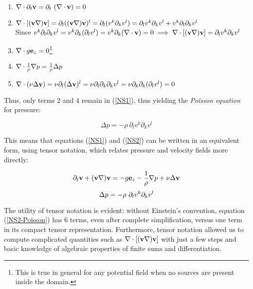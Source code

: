 \begin{enumerate}
 \item $\nabla\cdot \partial_t\mathbf{v} = \partial_t \ (\nabla\cdot \mathbf{v}) = 0$
 \item $\nabla\cdot [(\mathbf{v}\nabla)\mathbf{v}] = \partial_l((\mathbf{v}\nabla)\mathbf{v})^l = \partial_l(v^k\partial_kv^l) = \partial_lv^k\partial_kv^l + v^k\partial_l\partial_kv^l$ \\Since $v^k\partial_l\partial_kv^l = v^k\partial_k(\partial_lv^l) = v^k\partial_k (\nabla\cdot \mathbf{v}) = 0 \implies \nabla\cdot [(\mathbf{v}\nabla)\mathbf{v}] = \partial_lv^k\partial_kv^l$
 \item $\nabla\cdot g\mathbf{e}_z = 0$\footnote{This is true in general for any potential field when no sources are present inside the domain.}
 \item $\nabla\cdot\frac{1}{\rho}\nabla p = \frac{1}{\rho}\Delta p$
 \item $\nabla\cdot (\nu\Delta\mathbf{v}) = \nu\partial_l(\Delta\mathbf{v})^l = \nu\partial_l\partial_k\partial_kv^l = \nu\partial_k\partial_k(\partial_lv^l) = 0$
\end{enumerate}

Thus, only terms $2$ and $4$ remain in (\ref{NS1}), thus yielding the \emph{Poisson equation} for pressure:

\begin{equation}
\Delta p = - \rho ~\partial_lv^k\partial_kv^l
\end{equation}

This means that equations (\ref{NS1}) and (\ref{NS2}) can be written in an equivalent form, using tensor notation, which relates pressure and velocity fields more directly:

\begin{equation} \label{NS1-Poisson}
\partial_t\mathbf{v} + (\mathbf{v}\nabla)\mathbf{v} = -g\mathbf{e}_z - \frac{1}{\rho}\nabla p + \nu\Delta\mathbf{v} 
\end{equation}
\begin{equation} \label{NS2-Poisson}
\Delta p = - \rho ~\partial_lv^k\partial_kv^l
\end{equation}

The utility of tensor notation is evident: without Einstein's convention, equation (\ref{NS2-Poisson}) has $6$ terms, even after complete simplification, versus one term in its compact tensor representation. Furthermore, tensor notation allowed us to compute complicated quantities such as $\nabla\cdot [(\mathbf{v}\nabla)\mathbf{v}]$ with just a few steps and basic knowledge of algebraic properties of finite sums and differentiation.

